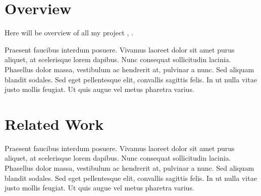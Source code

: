 \section{Overview} \label{sec:1.1}
\vspace{-0.5cm}
\noindent Here will be overview of all my project \cite{Haykins}, \cite{Hayes}.

\vspace{-0.5cm}
\par
\noindent Praesent faucibus interdum posuere. Vivamus laoreet dolor sit amet purus aliquet, at scelerisque lorem dapibus. Nunc consequat sollicitudin lacinia. Phasellus dolor massa, vestibulum ac hendrerit at, pulvinar a nunc. Sed aliquam blandit sodales. Sed eget pellentesque elit, convallis sagittis felis. In ut nulla vitae justo mollis feugiat. Ut quis augue vel metus pharetra varius.

\vspace{-0.3cm}
\section{Related Work}\label{sec:1.2}
\vspace{-0.6cm}
\noindent Praesent faucibus interdum posuere. Vivamus laoreet dolor sit amet purus aliquet, at scelerisque lorem dapibus. Nunc consequat sollicitudin lacinia. Phasellus dolor massa, vestibulum ac hendrerit at, pulvinar a nunc. Sed aliquam blandit sodales. Sed eget pellentesque elit, convallis sagittis felis. In ut nulla vitae justo mollis feugiat. Ut quis augue vel metus pharetra varius.



\vspace{-0.3cm}
